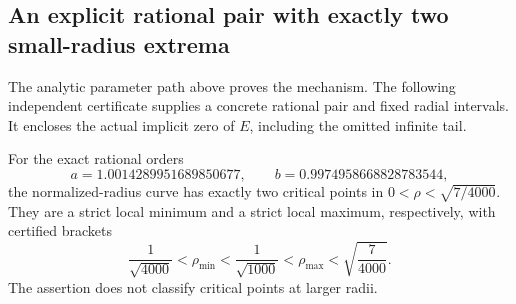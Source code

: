 \subsection{An explicit rational pair with exactly two small-radius extrema}

The analytic parameter path above proves the mechanism. The following
independent certificate supplies a concrete rational pair and fixed
radial intervals. It encloses the actual implicit zero of $E$, including
the omitted infinite tail.

\begin{theorem}
\label{rd:thm:explicit}
For the exact rational orders
\begin{equation}\label{rd:eq:explicitpair}
 a=1.0014289951689850677,\qquad b=0.9974958668828783544,
\end{equation}
the normalized-radius curve has exactly two critical points in
$0<\rho<\sqrt{7/4000}$. They are a strict local minimum and a strict
local maximum, respectively, with certified brackets
\begin{equation}\label{rd:eq:explicitbrackets}
 \frac1{\sqrt{4000}}<\rho_{\min}<\frac1{\sqrt{1000}}
 <\rho_{\max}<\sqrt{\frac7{4000}}.
\end{equation}
The assertion does not classify critical points at larger radii.
\end{theorem}

